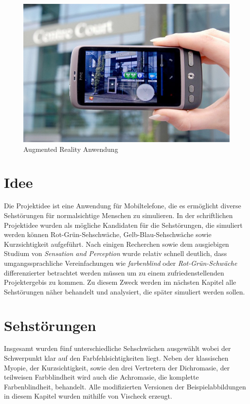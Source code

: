 \documentclass[a4paper]{article}
\begin{document}
\begin{figure}[H]
\centering
\includegraphics[width=\textwidth, trim=0 55 0 65, clip=true]{augmented-reality.jpg}
\caption{Augmented Reality Anwendung}
\label{augmented-reality}
\end{figure}

\newpage

\section*{Idee}
Die Projektidee ist eine Anwendung für Mobiltelefone, die es ermöglicht diverse Sehstörungen für normalsichtige Menschen zu simulieren. In der schriftlichen Projektidee wurden als mögliche Kandidaten für die Sehstörungen, die simuliert werden können Rot-Grün-Sehschwäche, Gelb-Blau-Sehschwäche sowie Kurzsichtigkeit aufgeführt. Nach einigen Recherchen sowie dem ausgiebigen Studium von \textit{Sensation and Perception} \cite{Goldstein2009} wurde relativ schnell deutlich, dass umgangssprachliche Vereinfachungen wie \textit{farbenblind} oder \textit{Rot-Grün-Schwäche} differenzierter betrachtet werden müssen um zu einem zufriedenstellenden Projektergebis zu kommen. Zu diesem Zweck werden im nächsten Kapitel alle Sehstörungen näher behandelt und analysiert, die später simuliert werden sollen.

\section*{Sehstörungen}
Insgesamt wurden fünf unterschiedliche Sehschwächen ausgewählt wobei der Schwerpunkt klar auf den Farbfehlsichtigkeiten liegt. Neben der klassischen Myopie, der Kurzsichtigkeit, sowie den drei Vertretern der Dichromasie, der teilweisen Farbblindheit \cite{WP-D} wird auch die Achromasie, die komplette Farbenblindheit, behandelt. Alle modifizierten Versionen der Beispielabbildungen in diesem Kapitel wurden mithilfe von Vischeck \cite{VISCHECK} erzeugt.
\end{document}
